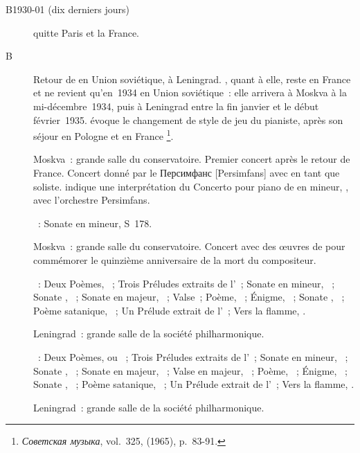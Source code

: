 \begin{description}
 \item[B1930-01 (dix derniers jours)]
 \VSofronitsky{} quitte Paris et la France.
 \item[B]
 Retour de \VSofronitsky{} en Union soviétique, à Leningrad.
 \EScriabina{}, quant à elle, reste en France et ne revient qu'en~1934 en
 Union soviétique~: elle arrivera à Moskva à la mi-décembre~1934, puis à
 Leningrad entre la fin janvier et le début février~1935.
 \citet[p.~90]{Bogdanov65} évoque le changement de style de jeu du pianiste,
 après son séjour en Pologne et en France%
 \footnote{\foreignlanguage{russian}{\emph{Советская музыка}}, vol.~325,
  (1965), p.~83-91.}.
 \item[]
 Moskva~: grande salle du conservatoire.
 Premier concert après le retour de France.
 Concert donné par le \foreignlanguage{russian}{Персимфанс}
 [Persimfans] avec \VSofronitsky{} en tant que
 soliste.
 \citet[p.~152]{Nekrasova08} indique une interprétation du Concerto pour
 piano de \Scriabine{} en \kF \Sharp mineur, , avec l'orchestre
 Persimfans.

 \textsc{\Liszt{}}~: Sonate en \kB mineur, S~178.
 \item[]
 Moskva~: grande salle du conservatoire.
 Concert avec des œuvres de \Scriabine{} pour commémorer le quinzième
 anniversaire de la mort du compositeur.

 \textsc{\Scriabine{}}~: Deux Poèmes, ~; Trois Préludes extraits de
 l'~; Sonate  en \kF \Sharp mineur, ~; Sonate
 , ~; Sonate  en \kF \Sharp majeur, ~;
 Valse~; Poème,  ~; Énigme,  ~; Sonate
 , ~; Poème satanique, ~; Un Prélude extrait de
 l'~; Vers la flamme, .
 \item[]
 Leningrad~: grande salle de la société philharmonique.

 \textsc{\Scriabine{}}~: Deux Poèmes,  ou ~; Trois
 Préludes extraits de l'~; Sonate  en \kF \Sharp mineur,
 ~; Sonate , ~; Sonate  en \kF \Sharp
 majeur, ~; Valse en \kA \Flat majeur, ~; Poème, 
 ~; Énigme,  ~; Sonate , ~;
 Poème satanique, ~; Un Prélude extrait de l'~; Vers la
 flamme, .
 \item[]
 Leningrad~: grande salle de la société philharmonique.


\end{description}
